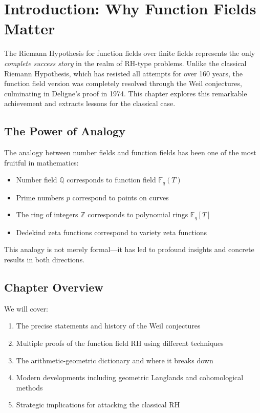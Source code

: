 
\section{Introduction: Why Function Fields Matter}

The Riemann Hypothesis for function fields over finite fields represents the only \emph{complete success story} in the realm of RH-type problems. Unlike the classical Riemann Hypothesis, which has resisted all attempts for over 160 years, the function field version was completely resolved through the Weil conjectures, culminating in Deligne's proof in 1974. This chapter explores this remarkable achievement and extracts lessons for the classical case.

\subsection{The Power of Analogy}

The analogy between number fields and function fields has been one of the most fruitful in mathematics:
\begin{itemize}
\item Number field $\mathbb{Q}$ corresponds to function field $\mathbb{F}_q(T)$
\item Prime numbers $p$ correspond to points on curves
\item The ring of integers $\mathbb{Z}$ corresponds to polynomial rings $\mathbb{F}_q[T]$
\item Dedekind zeta functions correspond to variety zeta functions
\end{itemize}

This analogy is not merely formal—it has led to profound insights and concrete results in both directions.

\subsection{Chapter Overview}

We will cover:
\begin{enumerate}
\item The precise statements and history of the Weil conjectures
\item Multiple proofs of the function field RH using different techniques
\item The arithmetic-geometric dictionary and where it breaks down
\item Modern developments including geometric Langlands and cohomological methods
\item Strategic implications for attacking the classical RH
\end{enumerate}

